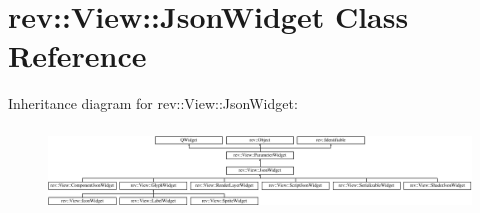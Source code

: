 \hypertarget{classrev_1_1_view_1_1_json_widget}{}\section{rev\+::View\+::Json\+Widget Class Reference}
\label{classrev_1_1_view_1_1_json_widget}
Inheritance diagram for rev\+::View\+::Json\+Widget\+:\begin{figure}[H]
\begin{center}
\leavevmode
\includegraphics[height=2.254428cm]{classrev_1_1_view_1_1_json_widget}
\end{center}
\end{figure}

